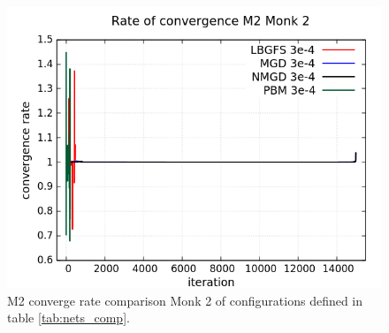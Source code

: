 \begin{figure}[H]
	\centering
	\includegraphics[width=0.6\linewidth]{data/Comparison/Monk2/Monk2_M2_CR_standard.png}
	\caption{M2 converge rate comparison Monk 2 of configurations defined in table \ref{tab:nets_comp}.}
	\label{fig:CR-M2-Monk2-Standard}
\end{figure}

